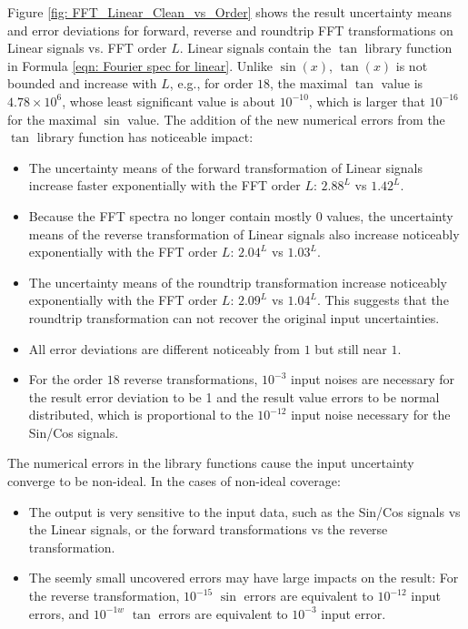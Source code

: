 \documentclass[twoside]{article}
\numberwithin{equation}{section}
\begin{document}
Figure \ref{fig: FFT_Linear_Clean_vs_Order} shows the result uncertainty means and error deviations for forward, reverse and roundtrip FFT transformations on Linear signals vs. FFT order $L$.
Linear signals contain the $\tan$ library function in Formula \eqref{eqn: Fourier spec for linear}.
Unlike $\sin(x)$, $\tan(x)$ is not bounded and increase with $L$, e.g., for order $18$, the maximal $\tan$ value is $4.78 \times 10^6$, whose least significant value is about $10^{-10}$, which is larger that $10^{-16}$ for the maximal $\sin$ value.
The addition of the new numerical errors from the $\tan$ library function has noticeable impact:
\begin{itemize}
\item The uncertainty means of the forward transformation of Linear signals increase faster exponentially with the FFT order $L$: $2.88^L$ vs $1.42^L$.

\item Because the FFT spectra no longer contain mostly $0$ values, the uncertainty means of the reverse transformation of Linear signals also increase noticeably exponentially with the FFT order $L$: $2.04^L$ vs $1.03^L$.

\item The uncertainty means of the roundtrip transformation increase noticeably exponentially with the FFT order $L$: $2.09^L$ vs $1.04^L$.  
This suggests that the roundtrip transformation can not recover the original input uncertainties.

\item All error deviations are different noticeably from $1$ but still near $1$. 

\item For the order $18$ reverse transformations, $10^{-3}$ input noises are necessary for the result error deviation to be 1 and the result value errors to be normal distributed, which is proportional to the $10^{-12}$ input noise necessary for the Sin/Cos signals.
\end{itemize}

The numerical errors in the library functions cause the input uncertainty converge to be non-ideal.
In the cases of non-ideal coverage:
\begin{itemize}
\item The output is very sensitive to the input data, such as the Sin/Cos signals vs the Linear signals, or the forward transformations vs the reverse transformation.

\item The seemly small uncovered errors may have large impacts on the result: For the reverse transformation, $10^{-15}$ $\sin$ errors are equivalent to $10^{-12}$ input errors, and $10^{-1w}$ $\tan$ errors are equivalent to $10^{-3}$ input error.
\end{itemize}
\end{document}
